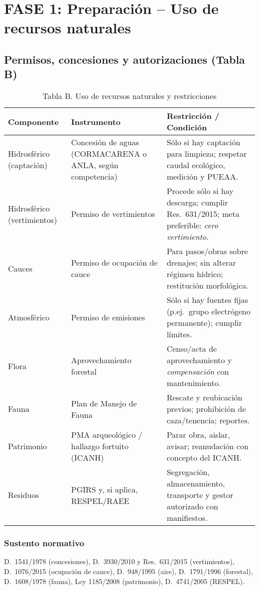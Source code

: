 \section{FASE 1: Preparación -- Uso de recursos naturales}
\subsection{Permisos, concesiones y autorizaciones (Tabla B)}
\begin{table}[h]
\centering
\caption{Tabla B. Uso de recursos naturales y restricciones}
\begin{tabular}{|l|l|p{8.6cm}|}
\hline
\textbf{Componente} & \textbf{Instrumento} & \textbf{Restricción / Condición}\\ \hline
Hidrosférico (captación) & Concesión de aguas (CORMACARENA o ANLA, según competencia) & Sólo si hay captación para limpieza; respetar caudal ecológico, medición y PUEAA. \\ \hline
Hidrosférico (vertimientos) & Permiso de vertimientos & Procede sólo si hay descarga; cumplir Res.\ 631/2015; meta preferible: \textit{cero vertimiento}.\\ \hline
Cauces & Permiso de ocupación de cauce & Para pasos/obras sobre drenajes; sin alterar régimen hídrico; restitución morfológica.\\ \hline
Atmosférico & Permiso de emisiones & Sólo si hay fuentes fijas (p.ej.\ grupo electrógeno permanente); cumplir límites.\\ \hline
Flora & Aprovechamiento forestal & Censo/acta de aprovechamiento y \textit{compensación} con mantenimiento.\\ \hline
Fauna & Plan de Manejo de Fauna & Rescate y reubicación previos; prohibición de caza/tenencia; reportes.\\ \hline
Patrimonio & PMA arqueológico / hallazgo fortuito (ICANH) & Parar obra, aislar, avisar; reanudación con concepto del ICANH.\\ \hline
Residuos & PGIRS y, si aplica, RESPEL/RAEE & Segregación, almacenamiento, transporte y gestor autorizado con manifiestos.\\ \hline
\end{tabular}
\end{table}

\subsubsection*{Sustento normativo}
D.\ 1541/1978 (concesiones), D.\ 3930/2010 y Res.\ 631/2015 (vertimientos), D.\ 1076/2015 (ocupación de cauce), D.\ 948/1995 (aire), D.\ 1791/1996 (forestal), D.\ 1608/1978 (fauna), Ley 1185/2008 (patrimonio), D.\ 4741/2005 (RESPEL).
